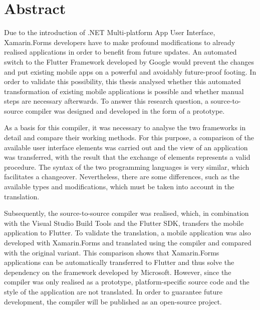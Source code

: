\chapter*{Abstract}

Due to the introduction of .NET Multi-platform App User Interface,  Xamarin.Forms developers have to make profound modifications to already realised applications in order to benefit from future updates.  An automated switch to the Flutter Framework developed by Google would prevent the changes and put existing mobile apps on a powerful and avoidably future-proof footing.  In order to validate this possibility, this thesis analysed whether this automated transformation of existing mobile applications is possible and whether manual steps are necessary afterwards.  To answer this research question, a source-to-source compiler was designed and developed in the form of a prototype.  

As a basis for this compiler, it was necessary to analyse the two frameworks in detail and compare their working methods.  For this purpose, a comparison of the available user interface elements was carried out and the view of an application was transferred, with the result that the exchange of elements represents a valid procedure.  The syntax of the two programming languages is very similar, which facilitates a changeover. Nevertheless, there are some differences, such as the available types and modifications, which must be taken into account in the translation.  

Subsequently, the source-to-source compiler was realised, which, in combination with the Visual Studio Build Tools and the Flutter SDK, transfers the mobile application to Flutter. To validate the translation, a mobile application was also developed with Xamarin.Forms and translated using the compiler and compared with the original variant.  
This comparison shows that Xamarin.Forms applications can be automatically transferred to Flutter and thus solve the dependency on the framework developed by Microsoft.  However, since the compiler was only realised as a prototype, platform-specific source code and the style of the application are not translated.  In order to guarantee future development, the compiler will be published as an open-source project. 

